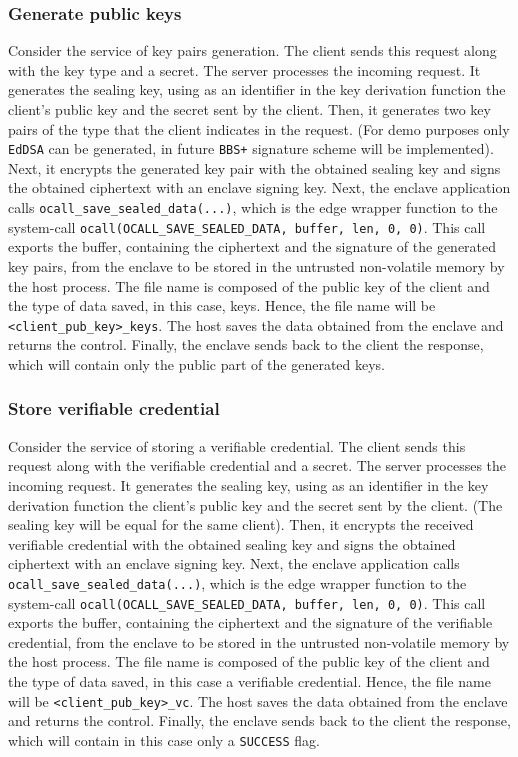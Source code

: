 \subsubsection{Generate public keys}
Consider the service of key pairs generation. The client sends this request along with the key type and a secret. The server processes the incoming request. It generates the sealing key, using as an identifier in the key derivation function the client's public key and the secret sent by the client. Then, it generates two key pairs of the type that the client indicates in the request. (For demo purposes only \texttt{EdDSA} can be generated, in future \texttt{BBS+} signature scheme will be implemented). 
Next, it encrypts the generated key pair with the obtained sealing key and signs the obtained ciphertext with an enclave signing key. Next, the enclave application calls \texttt{ocall\_save\_sealed\_data(...)}, which is the edge wrapper function to the system-call \texttt{ocall(OCALL\_SAVE\_SEALED\_DATA, buffer, len, 0, 0)}. This call exports the buffer, containing the ciphertext and the signature of the generated key pairs, from the enclave to be stored in the untrusted non-volatile memory by the host process. The file name is composed of the public key of the client and the type of data saved, in this case, keys. Hence, the file name will be \texttt{<client\_pub\_key>\_keys}. The host saves the data obtained from the enclave and returns the control. 
Finally, the enclave sends back to the client the response, which will contain only the public part of the generated keys. 

\subsubsection{Store verifiable credential}
Consider the service of storing a verifiable credential. The client sends this request along with the verifiable credential and a secret. The server processes the incoming request. It generates the sealing key, using as an identifier in the key derivation function the client's public key and the secret sent by the client. (The sealing key will be equal for the same client). Then, it encrypts the received verifiable credential with the obtained sealing key and signs the obtained ciphertext with an enclave signing key. Next, the enclave application calls \texttt{ocall\_save\_sealed\_data(...)}, which is the edge wrapper function to the system-call \texttt{ocall(OCALL\_SAVE\_SEALED\_DATA, buffer, len, 0, 0)}. This call exports the buffer, containing the ciphertext and the signature of the verifiable credential, from the enclave to be stored in the untrusted non-volatile memory by the host process. The file name is composed of the public key of the client and the type of data saved, in this case a verifiable credential. Hence, the file name will be \texttt{<client\_pub\_key>\_vc}. The host saves the data obtained from the enclave and returns the control. 
Finally, the enclave sends back to the client the response, which will contain in this case only a \texttt{SUCCESS} flag. \\

